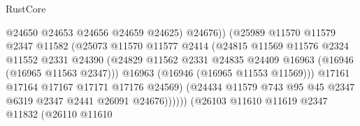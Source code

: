 \begin{lexlean}{RustCore}
\begin{coremodule}
                                          @24650
                                          @24653
                                          @24656
                                          @24659
                                          @24625)
                                        @24676))
                                    (@25989
                                      @11570
                                      @11579
                                      @2347
                                      @11582
                                      (@25073
                                        @11570
                                        @11577
                                        @2414
                                        (@24815
                                          @11569
                                          @11576
                                          @2324
                                          @11552
                                          @2331
                                          @24390
                                          (@24829
                                            @11562
                                            @2331
                                            @24835
                                            @24409
                                            @16963
                                            (@16946 (@16965 @11563 @2347)))
                                          @16963
                                          (@16946 (@16965 @11553 @11569)))
                                        @17161
                                        @17164
                                        @17167
                                        @17171
                                        @17176
                                        @24569)
                                      (@24434
                                        @11579
                                        @743
                                        @95
                                        @45
                                        @2347
                                        @6319
                                        @2347
                                        @2441
                                        @26091
                                        @24676))))))
                            (@26103
                              @11610
                              @11619
                              @2347
                              @11832
                              (@26110
                                @11610

\end{coremodule}
\end{lexlean}
